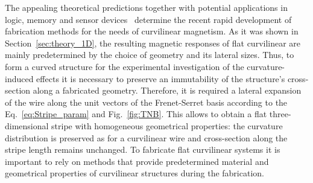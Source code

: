 The appealing theoretical predictions together with potential applications in logic, memory and sensor devices~\cite{Allwood02,Allwood05,Parkin08,Parkin15} determine the recent rapid development of fabrication methods for the needs of curvilinear magnetism. As it was shown in Section~\ref{sec:theory_1D}, the resulting magnetic responses of flat curvilinear are mainly predetermined by the choice of geometry and its lateral sizes. Thus, to form a curved structure for the experimental investigation of the curvature-induced effects it is necessary to preserve an immutability of the structure's cross-section along a fabricated geometry. Therefore, it is required a lateral expansion of the wire along the unit vectors of the Frenet-Serret basis according to the Eq.~\eqref{eq:Stripe_param} and Fig.~\ref{fig:TNB}. This allows to obtain a flat three-dimensional stripe with homogeneous geometrical properties: the curvature distribution is preserved as for a curvilinear wire and cross-section along the stripe length remains unchanged. To fabricate flat curvilinear systems it is important to rely on methods that provide predetermined material and geometrical properties of curvilinear structures during the fabrication. 

